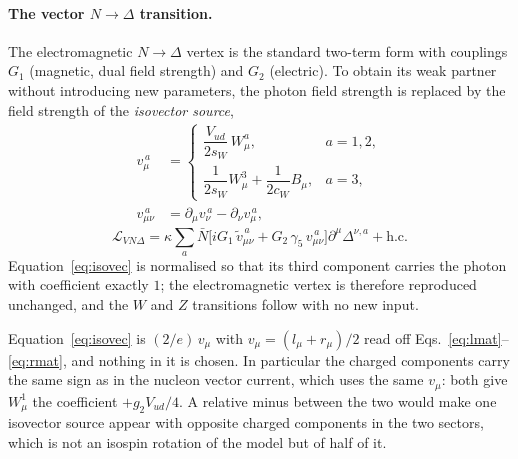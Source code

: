 \documentclass[11pt,a4paper]{article}
\begin{document}
\paragraph{The vector $N\to\Delta$ transition.}
The electromagnetic $N\to\Delta$ vertex is the standard two-term form with
couplings $G_1$ (magnetic, dual field strength) and $G_2$ (electric). To obtain
its weak partner without introducing new parameters, the photon field strength
is replaced by the field strength of the \emph{isovector source},
\begin{align}
  v^{\,a}_\mu &=
    \begin{cases}
      \dfrac{V_{ud}}{2 s_W}\, W^{a}_\mu, & a = 1,2,\\[2mm]
      \dfrac{1}{2 s_W} W^3_\mu + \dfrac{1}{2 c_W} B_\mu, & a = 3,
    \end{cases}
  \label{eq:isovec}\\
  v^{\,a}_{\mu\nu} &= \partial_\mu v^{\,a}_\nu - \partial_\nu v^{\,a}_\mu ,
\end{align}
\begin{equation}
  \mathcal{L}_{VN\Delta}
  = \kappa \sum_{a}\bar N\Big[
      i G_1\, \tilde v^{\,a}_{\mu\nu}
      + G_2\, \gamma_5\, v^{\,a}_{\mu\nu}\Big]
      \partial^{\mu}\Delta^{\nu,a} + \mathrm{h.c.}
  \label{eq:vndelta}
\end{equation}
Equation~\eqref{eq:isovec} is normalised so that its third component carries the
photon with coefficient exactly $1$; the electromagnetic vertex is therefore
reproduced unchanged, and the $W$ and $Z$ transitions follow with no new input.

Equation~\eqref{eq:isovec} is $(2/e)\,v_\mu$ with
$v_\mu = (l_\mu + r_\mu)/2$ read off Eqs.~\eqref{eq:lmat}--\eqref{eq:rmat}, and
nothing in it is chosen. In particular the charged components carry the same
sign as in the nucleon vector current, which uses the same $v_\mu$: both give
$W^1_\mu$ the coefficient $+g_2 V_{ud}/4$. A relative minus between the two
would make one isovector source appear with opposite charged components in the
two sectors, which is not an isospin rotation of the model but of half of it.
\end{document}
